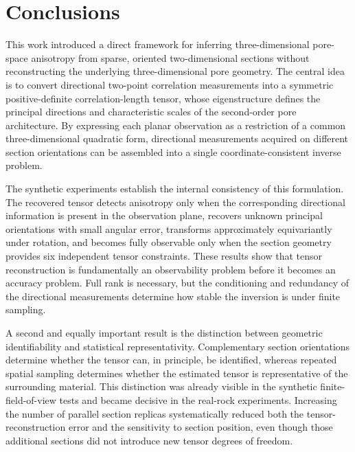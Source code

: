 \documentclass{article}
\begin{document}

\section{Conclusions}
\label{sec:conclusions}

This work introduced a direct framework for inferring three-dimensional pore-space anisotropy from sparse, oriented two-dimensional sections without reconstructing the underlying three-dimensional pore geometry. The central idea is to convert directional two-point correlation measurements into a symmetric positive-definite correlation-length tensor, whose eigenstructure defines the principal directions and characteristic scales of the second-order pore architecture. By expressing each planar observation as a restriction of a common three-dimensional quadratic form, directional measurements acquired on different section orientations can be assembled into a single coordinate-consistent inverse problem.

The synthetic experiments establish the internal consistency of this formulation. The recovered tensor detects anisotropy only when the corresponding directional information is present in the observation plane, recovers unknown principal orientations with small angular error, transforms approximately equivariantly under rotation, and becomes fully observable only when the section geometry provides six independent tensor constraints. These results show that tensor reconstruction is fundamentally an observability problem before it becomes an accuracy problem. Full rank is necessary, but the conditioning and redundancy of the directional measurements determine how stable the inversion is under finite sampling.

A second and equally important result is the distinction between geometric identifiability and statistical representativity. Complementary section orientations determine whether the tensor can, in principle, be identified, whereas repeated spatial sampling determines whether the estimated tensor is representative of the surrounding material. This distinction was already visible in the synthetic finite-field-of-view tests and became decisive in the real-rock experiments. Increasing the number of parallel section replicas systematically reduced both the tensor-reconstruction error and the sensitivity to section position, even though those additional sections did not introduce new tensor degrees of freedom.
\end{document}
